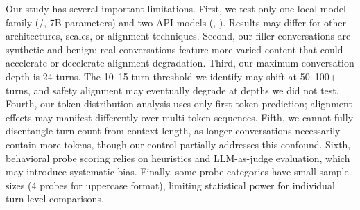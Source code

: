 Our study has several important limitations. First, we test only one local model family (\qwenbase/\qweninst, 7B parameters) and two API models (\gptmini, \gptnano). Results may differ for other architectures, scales, or alignment techniques. Second, our filler conversations are synthetic and benign; real conversations feature more varied content that could accelerate or decelerate alignment degradation. Third, our maximum conversation depth is 24 turns. The 10--15 turn threshold we identify may shift at 50--100+ turns, and safety alignment may eventually degrade at depths we did not test. Fourth, our token distribution analysis uses only first-token prediction; alignment effects may manifest differently over multi-token sequences. Fifth, we cannot fully disentangle turn count from context length, as longer conversations necessarily contain more tokens, though our \concat control partially addresses this confound. Sixth, behavioral probe scoring relies on heuristics and LLM-as-judge evaluation, which may introduce systematic bias. Finally, some probe categories have small sample sizes (4 probes for uppercase format), limiting statistical power for individual turn-level comparisons.
